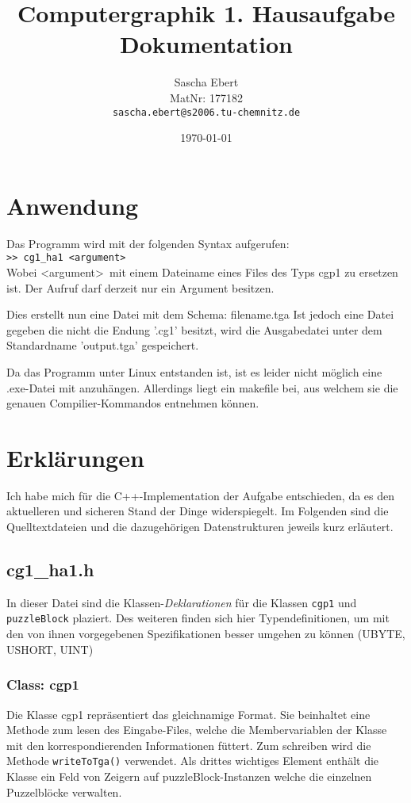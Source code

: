 \documentclass{article}
\title{Computergraphik 1. Hausaufgabe\\Dokumentation}
\author
{
	Sascha Ebert\\
	MatNr: 177182\\
	\texttt{sascha.ebert@s2006.tu-chemnitz.de}
}
\date{\today}
\begin{document}
\maketitle

\section{Anwendung}
Das Programm wird mit der folgenden Syntax aufgerufen:\\
\texttt{>> cg1\_ha1 <argument>}\\
Wobei \textless argument\textgreater\ mit einem Dateiname eines Files des Typs
cgp1 zu ersetzen ist. Der Aufruf darf derzeit nur ein Argument besitzen.

Dies erstellt nun eine Datei mit dem Schema: filename.tga
Ist jedoch eine Datei gegeben die nicht die Endung '.cg1' besitzt,
wird die Ausgabedatei unter dem Standardname 'output.tga' gespeichert.

Da das Programm unter Linux entstanden ist, ist es leider nicht möglich eine .exe-Datei
mit anzuhängen. Allerdings liegt ein makefile bei, aus welchem sie die genauen Compilier-Kommandos
entnehmen können.

\section{Erklärungen}

Ich habe mich für die C++-Implementation der Aufgabe entschieden, da es den aktuelleren
und sicheren Stand der Dinge widerspiegelt.
Im Folgenden sind die Quelltextdateien und die dazugehörigen Datenstrukturen jeweils kurz erläutert.

\subsection{cg1\_ha1.h}
In dieser Datei sind die Klassen-\emph{Deklarationen} für die Klassen \texttt{cgp1} und \texttt{puzzleBlock} plaziert.
Des weiteren finden sich hier Typendefinitionen, um mit den von ihnen vorgegebenen Spezifikationen besser umgehen
zu können (UBYTE, USHORT, UINT)

\subsubsection{Class: cgp1}
Die Klasse cgp1 repräsentiert das gleichnamige Format. Sie beinhaltet eine Methode zum lesen des Eingabe-Files,
welche die Membervariablen der Klasse mit den korrespondierenden Informationen füttert. Zum schreiben wird die Methode
\texttt{writeToTga()} verwendet. Als drittes wichtiges Element enthält die Klasse ein Feld von Zeigern auf
puzzleBlock-Instanzen welche die einzelnen Puzzelblöcke verwalten.
\end{document}
